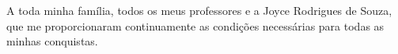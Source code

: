 \maketitle

\begin{itadedication}
A toda minha família, todos os meus professores e a Joyce Rodrigues de Souza, que me proporcionaram continuamente as condições necessárias para todas as minhas conquistas.
\end{itadedication}

%

\thispagestyle{empty}
\ifhyperref{}\fi
\begin{flushright}
\begin{spacing}{1}
\mbox{}\vfill

\end{spacing}
\end{flushright}

\begin{abstract}
\noindent

\end{abstract}

\begin{englishabstract}
\noindent

\end{englishabstract}

\listoffigures %

\listoftables %

\listofabbreviations


\tableofcontents
